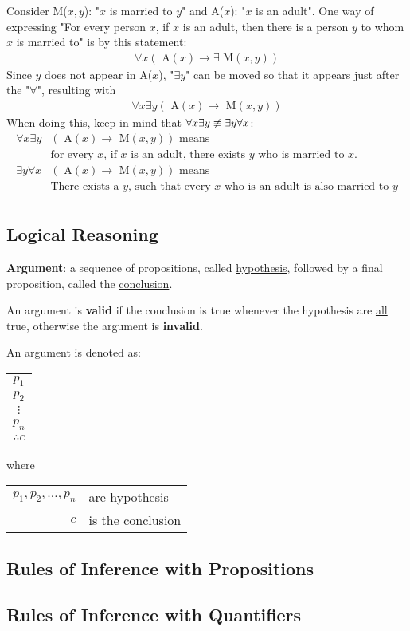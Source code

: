 \documentclass{article}
\begin{document}
Consider M($x, y$): "$x$ is married to $y$" and A($x$): "$x$ is an adult".
One way of expressing "For every person $x$, if $x$ is an adult, then
there is a person $y$ to whom $x$ is married to" is by this statement:
\begin{align*}
  \forall x (\text{ A}(x) \rightarrow \exists \text{ M}(x, y))
\end{align*}
Since $y$ does not appear in A($x$), "\(\exists y\)" can be moved so that it appears
just after the "\(\forall\)", resulting with
\begin{align*}
  \forall x \exists y (\text{ A}(x) \rightarrow \text{ M}(x, y))
\end{align*}
When doing this, keep in mind that \(\forall x \exists y \centernot \equiv \exists y \forall x\):
\begin{align*}
  \forall x \exists y & (\text{ A}(x) \rightarrow \text{ M}(x, y)) \text{ means}                              \\
                      & \text{for every $x$, if $x$ is an adult, there exists $y$ who is married to $x$.}     \\
  \exists y \forall x & (\text{ A}(x) \rightarrow \text{ M}(x, y)) \text{ means}                              \\
                      & \text{There exists a $y$, such that every $x$ who is an adult is also married to $y$} \\
\end{align*}

\subsection{Logical Reasoning}

\textbf{Argument}: a sequence of propositions, called \underline{hypothesis}, followed
by a final proposition, called the \underline{conclusion}.

An argument is \textbf{valid} if the conclusion is true whenever the hypothesis
are \underline{all} true, otherwise the argument is \textbf{invalid}.

An argument is denoted as:
\begin{tabular}{c}
  \(p_1\)     \\
  \(p_2\)     \\
  \(\vdots \) \\
  \(p_n\)     \\
  \hline
  \(\therefore c\)
\end{tabular}
\quad where \quad
\begin{tabular}{rl}
  \(p_1, p_2, \ldots, p_n\) & are hypothesis    \\
  \(c\)                     & is the conclusion
\end{tabular}

\subsection{Rules of Inference with Propositions}



\subsection{Rules of Inference with Quantifiers}
\end{document}
